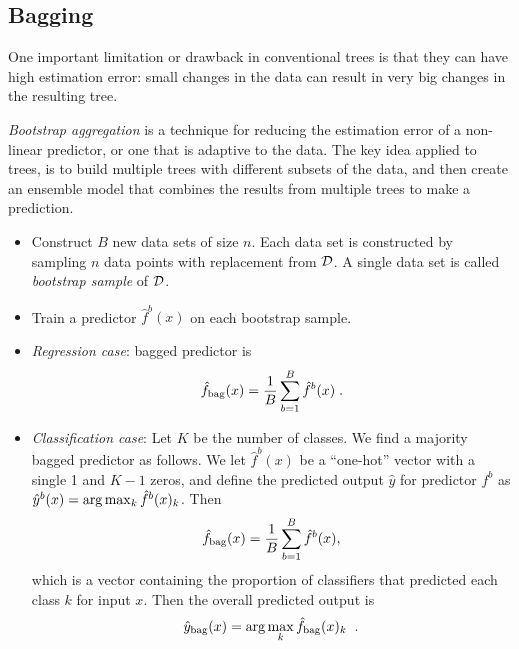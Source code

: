 \subsection{Bagging}
\label{sec-np_bagging}

One important limitation or drawback in conventional trees is
that they can have high estimation error: small changes in the data
can result in very big changes in the resulting tree.

  {\em Bootstrap aggregation} is a technique for reducing the estimation
error of a non-linear predictor, or one that is adaptive to the
data. The key idea applied to trees, is to build multiple
trees with different subsets of the data, and then create an ensemble
model that combines the results from multiple trees to make a
prediction.

\begin{itemize}
  \item Construct $B$ new data sets of size $n$. Each data set
        is constructed by sampling $n$ data points with replacement from ${\cal D}$.
        A single data set is called {\em bootstrap sample} of ${\cal D}$.
  \item Train a predictor $\hat{f}^b(x)$ on each bootstrap sample.
  \item {\em Regression case}:  bagged predictor is
        \begin{equation}
          \hat{f}_{\rm bag}(x) = \frac{1}{B} \sum_{b=1}^B \hat{f}^b(x) \; .
        \end{equation}

  \item {\em Classification case}:  Let $K$ be the number of classes. We
        find a majority bagged predictor as follows. We let
        $\hat{f}^b(x)$ be a ``one-hot'' vector with a single 1 and $K-1$ zeros,
        and define the predicted output $\hat{y}$ for predictor $f^b$ as
        $\hat{y}^b(x) = {\rm arg}\max_{k} \hat{f}^b(x)_k$.  Then
        \begin{equation}
          \hat{f}_{\rm bag}(x) = \frac{1}{B} \sum_{b=1}^B \hat{f}^b(x),
        \end{equation}
        which is a vector containing the proportion of classifiers that
        predicted each class $k$ for input $x$. Then the overall predicted output is
        \begin{equation}
          \hat{y}_{\rm bag}(x) = {\rm arg}\max_{k} \hat{f}_{\rm bag}(x)_k\;\;.
        \end{equation}

\end{itemize}

